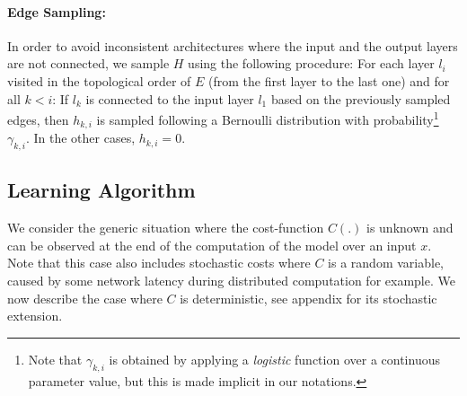 \documentclass[10pt,twocolumn,letterpaper]{article}
\begin{document}



\paragraph{Edge Sampling: } In order to avoid inconsistent architectures where the input and the output layers are not connected, we sample $H$ using the following procedure: For each layer $l_i$ visited in the topological order of $E$ (from the first layer to the last one) and for all $k<i$:  If $l_k$ is connected to the input layer $l_1$ based on the previously sampled edges, then $h_{k,i}$ is sampled following a Bernoulli distribution with probability\footnote{Note that $\gamma_{k,i}$ is obtained by applying a \textit{logistic} function over a continuous parameter value, but this is made implicit in our notations.} $\gamma_{k,i}$. In the other cases, $h_{k,i}=0$. 

\subsection{Learning Algorithm}
\label{s5}

We consider the generic situation where the cost-function $C(.)$ is unknown and can be observed at the end of the computation of the model over an input $x$. Note that this case also includes stochastic costs where $C$ is a random variable, caused by some network latency during distributed computation for example. We now describe  the case where $C$ is deterministic, see appendix  for its stochastic extension.
\end{document}
